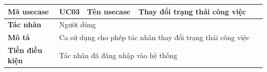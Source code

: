 \documentclass[../DoAn.tex]{subfiles}
\begin{document}
\begin{table}[ht]
    \renewcommand{\arraystretch}{1.2}
    \centering
    \begin{tabular}{| p{0.2\linewidth} | p{0.1\linewidth} | p{0.2\linewidth} | p{0.5\linewidth} |}
        \hline
        \textbf{Mã usecase}                                          & UC03                                                                                           & \textbf{Tên usecase}                                       & Thay đổi trạng thái công việc                                                                                                  \\ \hline
        \multicolumn{1}{|p{0.2\linewidth}|}{\textbf{Tác nhân}}       & \multicolumn{3}{p{0.8\linewidth}|}{Người dùng}                                                                                                                                                                                                                                               \\ \hline
        \multicolumn{1}{|p{0.2\linewidth}|}{\textbf{Mô tả}}          & \multicolumn{3}{p{0.8\linewidth}|}{Ca sử dụng cho phép tác nhân thay đổi trạng thái công việc}                                                                                                                                                                                               \\ \hline
        \multicolumn{1}{|p{0.2\linewidth}|}{\textbf{Tiền điều kiện}} & \multicolumn{3}{p{0.8\linewidth}|}{Tác nhân đã đăng nhập vào hệ thống}                                                                                                                                                                                                                       \\ \hline


\end{tabular}
\end{table}
\end{document}
